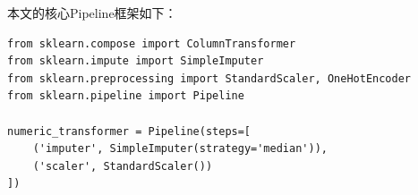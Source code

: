 本文的核心Pipeline框架如下：

\begin{lstlisting}[caption={基于Scikit-learn的Pipeline流程示例}]
from sklearn.compose import ColumnTransformer
from sklearn.impute import SimpleImputer
from sklearn.preprocessing import StandardScaler, OneHotEncoder
from sklearn.pipeline import Pipeline

numeric_transformer = Pipeline(steps=[
    ('imputer', SimpleImputer(strategy='median')),
    ('scaler', StandardScaler())
])
\end{lstlisting}
